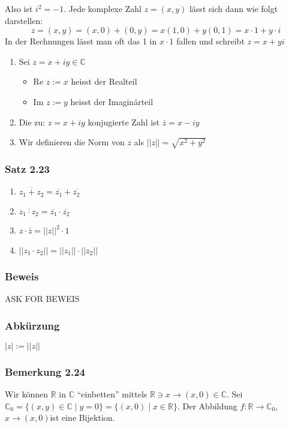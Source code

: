 Also ist $i^2=-1$. Jede komplexe Zahl $z=(x,y)$ lässt sich dann wie folgt darstellen:  \[z=(x,y)=(x,0)+(0,y)=x(1,0)+y(0,1)=x\cdot 1+ y\cdot i\]
In der Rechnungen lässt man oft das 1 in $x\cdot 1$ fallen und schreibt $z=x+yi$
\begin{definition}{2.22}
\begin{enumerate}
\item Sei $z=x+iy\in\mathbb{C}$
\begin{itemize}
\item Re $z:=x$ heisst der Realteil
\item Im $z:=y$ heisst der Imaginärteil 
\end{itemize}
\item Die zu: $z=x+iy$ konjugierte Zahl ist $\overline{z}=x-iy$
\item Wir definieren die Norm von $z$ als $\left|\left| z\right|\right|=\sqrt{x^2+y^2}$
\end{enumerate}
\end{definition}
\subsubsection*{Satz 2.23}
\begin{enumerate}[\indent (i)]
\item $\overline{z_1+z_2}=\overline{z_1}+\overline{z_2}$
\item $\overline{z_1\cdot z_2}=\overline{z_1}\cdot\overline{z_2}$
\item $z\cdot\overline{z}={\left|\left| z\right|\right|}^2\cdot 1$
\item ${\left|\left| z_1\cdot z_2\right|\right|}={\left|\left| z_1\right|\right|}\cdot{\left|\left| z_2\right|\right|}$
\end{enumerate}
\subsubsection*{Beweis}
ASK FOR BEWEIS 
\subsubsection*{Abkürzung}
$\left| z\right| := \left|\left| z \right|\right|$
\subsubsection*{Bemerkung 2.24}
Wir können $\mathbb{R}$ in $\mathbb{C}$ ``einbetten'' mittels $\mathbb{R}\ni x\rightarrow (x,0)\in\mathbb{C}$. Sei $\mathbb{C}_0=\{ (x,y)\in\mathbb{C}\mid y=0 \}=\{ (x,0)\mid x\in\mathbb{R}\}$. Der Abbildung $f:\mathbb{R}\rightarrow\mathbb{C}_0$, $x\rightarrow (x,0)$ist eine Bijektion.\\

